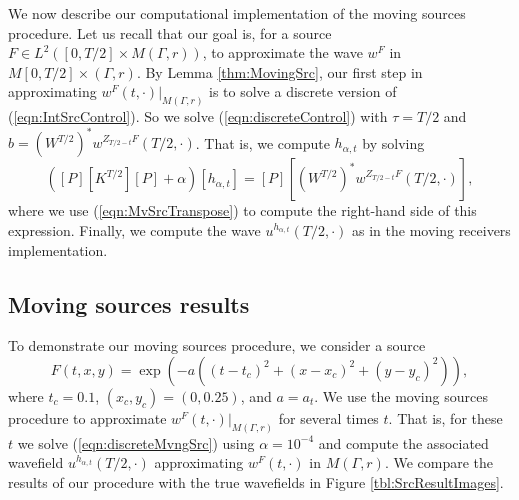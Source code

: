 \documentclass[final,leqno]{siamart1116}
\begin{document}
We now describe our computational implementation of the moving sources
procedure.  Let us recall that our goal is, for a source $F \in
L^2([0,T/2]\times M(\Gamma,r))$, to approximate the wave $w^F$ in
$M[0,T/2] \times (\Gamma,r)$. By Lemma \ref{thm:MovingSrc}, our first
step in approximating $w^F(t,\cdot)|_{M(\Gamma,r)}$ is to solve a
discrete version of (\ref{eqn:IntSrcControl}). So we solve
(\ref{eqn:discreteControl}) with $\tau = T/2$ and $b = (W^{T/2})^*
w^{Z_{T/2-t} F}(T/2,\cdot)$.  That is, we compute
$h_{\alpha,t}$ by solving
\begin{equation}
  \label{eqn:discreteMvngSrc}
  ([P] [K^{T/2}] [P] + \alpha) [h_{\alpha,t}] = [P] [(W^{T/2})^*
    w^{Z_{T/2-t} F}(T/2,\cdot)],
\end{equation}
where we use (\ref{eqn:MvSrcTranspose}) to compute the right-hand side
of this expression.  Finally, we compute the wave
$u^{h_{\alpha,t}}(T/2,\cdot)$ as in the moving receivers
implementation.

\subsection{Moving sources results}

To demonstrate our moving sources procedure, we consider a source
\begin{equation}
  F(t,x,y) = \exp\left(-a((t - t_c)^2 + (x - x_c)^2 + (y - y_c)^2)\right),
\end{equation} 
where $t_c = 0.1$, $(x_c,y_c) = (0, 0.25)$, and $a = a_t$.  We use the
moving sources procedure to approximate
$w^{F}(t,\cdot)|_{M(\Gamma,r)}$ for several times $t$. That is, for
these $t$ we solve (\ref{eqn:discreteMvngSrc}) using $\alpha =
10^{-4}$ and compute the associated wavefield
$u^{h_{\alpha,t}}(T/2,\cdot)$ approximating $w^F(t,\cdot)$ in
$M(\Gamma,r)$. We compare the results of our procedure with the true
wavefields in Figure \ref{tbl:SrcResultImages}.
\end{document}

